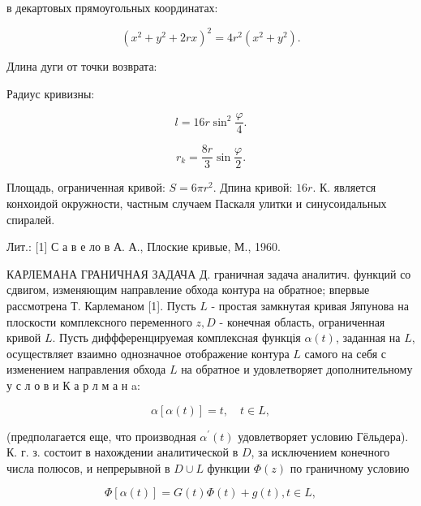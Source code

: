 \documentclass[10pt]{article}
\begin{document}
в декартовых прямоугольных координатах:



\[

\left(x^{2}+y^{2}+2 r x\right)^{2}=4 r^{2}\left(x^{2}+y^{2}\right) .

\]



Длина дуги от точки возврата:



Радиус кривизны:



\[

l=16 r \sin ^{2} \frac{\varphi}{4} .

\]



\[

r_{k}=\frac{8 r}{3} \sin \frac{\varphi}{2} .

\]



Площадь, ограниченная кривой: $S=6 \pi r^{2}$. Дпина кривой: $16 r$. К. является конхоидой окружности, частным случаем Паскаля улитки и синусоидальных спиралей.



Лит.: [1] С а в е ло в А. А., Плоские кривые, М., 1960.



КАРЛЕМАНА ГРАНИЧНАЯ ЗАДАЧА Д. граничная задача аналитич. функций со сдвигом, изменяющим направление обхода контура на обратное; впервые рассмотрена Т. Карлеманом [1]. Пусть $L$ - простая замкнутая кривая Јяпунова на плоскости комплексного переменного $z, D$ - конечная область, ограниченная кривой $L$. Пусть диффференцируемая комплексная функція $\alpha(t)$, заданная на $L$, осуществляет взаимно однозначное отображение контура $L$ самого на себя с изменением направления обхода $L$ на обратное и удовлетворяет дополнительному у с л о в и К а р л м а н a:



\[

\alpha[\alpha(t)]=t, \quad t \in L,

\]



(предполагается еще, что производная $\alpha^{\prime}(t)$ удовлетворяет условию Гёльдера). К. г. з. состоит в нахождении аналитической в $D$, за исключением конечного числа полюсов, и непрерывной в $D \cup L$ функции $\Phi(z)$ по граничному условию



\[

\Phi[\alpha(t)]=G(t) \Phi(t)+g(t), t \in L,

\]
\end{document}
